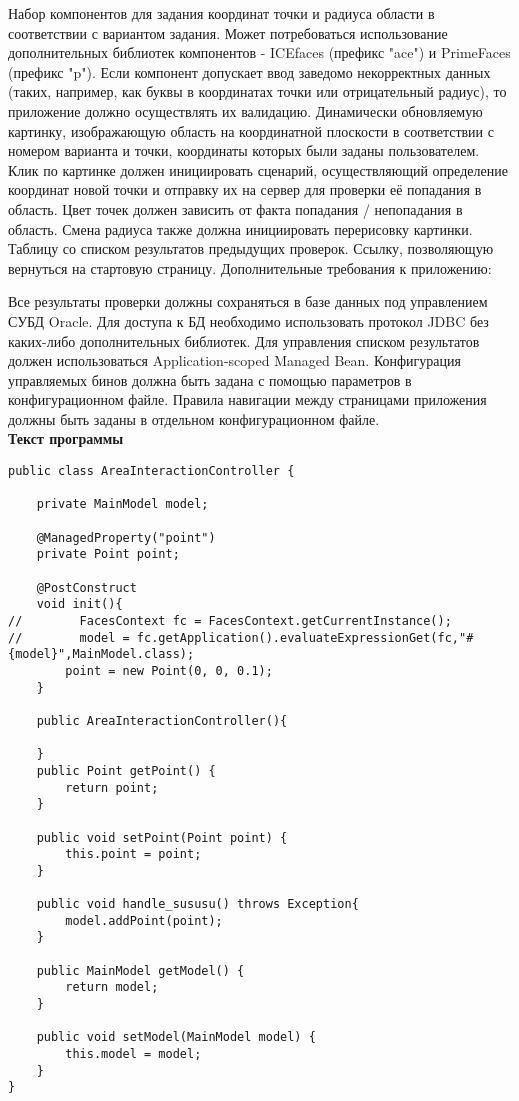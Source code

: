 \documentclass[14pt,a4paper,report]{ncc}
\begin{document}
Набор компонентов для задания координат точки и радиуса области в соответствии с вариантом задания. Может потребоваться использование дополнительных библиотек компонентов - ICEfaces (префикс "ace") и PrimeFaces (префикс "p"). Если компонент допускает ввод заведомо некорректных данных (таких, например, как буквы в координатах точки или отрицательный радиус), то приложение должно осуществлять их валидацию.
Динамически обновляемую картинку, изображающую область на координатной плоскости в соответствии с номером варианта и точки, координаты которых были заданы пользователем. Клик по картинке должен инициировать сценарий, осуществляющий определение координат новой точки и отправку их на сервер для проверки её попадания в область. Цвет точек должен зависить от факта попадания / непопадания в область. Смена радиуса также должна инициировать перерисовку картинки.
Таблицу со списком результатов предыдущих проверок.
Ссылку, позволяющую вернуться на стартовую страницу.
Дополнительные требования к приложению:

Все результаты проверки должны сохраняться в базе данных под управлением СУБД Oracle.
Для доступа к БД необходимо использовать протокол JDBC без каких-либо дополнительных библиотек.
Для управления списком результатов должен использоваться Application-scoped Managed Bean.
Конфигурация управляемых бинов должна быть задана с помощью параметров в конфигурационном файле.
Правила навигации между страницами приложения должны быть заданы в отдельном конфигурационном файле.
\\[2mm]
\large \textbf{Текст программы}\\
\small

\begin{lstlisting}public class AreaInteractionController {

    private MainModel model;

    @ManagedProperty("point")
    private Point point;

    @PostConstruct
    void init(){
//        FacesContext fc = FacesContext.getCurrentInstance();
//        model = fc.getApplication().evaluateExpressionGet(fc,"#{model}",MainModel.class);
        point = new Point(0, 0, 0.1);
    }

    public AreaInteractionController(){

    }
    public Point getPoint() {
        return point;
    }

    public void setPoint(Point point) {
        this.point = point;
    }

    public void handle_sususu() throws Exception{
        model.addPoint(point);
    }

    public MainModel getModel() {
        return model;
    }

    public void setModel(MainModel model) {
        this.model = model;
    }
}
\end{lstlisting}
\end{document}
